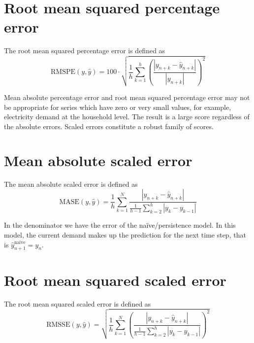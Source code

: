 \section{Root mean squared percentage error}\label{rmspe}
\begin{definition}
    The root mean squared percentage error is defined as
    $$
    \mathrm{RMSPE}(y,\hat{y})=100\cdot\sqrt{\frac{1}{h}\sum\limits_{k=1}^{h} \left(\frac{|y_{n+k}-\hat{y}_{n+k}|}{|y_{n+k}|}\right)^2}
    $$
\end{definition}
Mean absolute percentage error and root mean squared percentage error may not be appropriate for series which have zero or very small values, for example, electricity demand at the household level. The result is a large score regardless of the absolute errors.
Scaled errors constitute a robust family of scores.
\section{Mean absolute scaled error}\label{mase}
\begin{definition}
    The mean absolute scaled error is defined as
    $$
    \mathrm{MASE}(y,\hat{y})=\frac{1}{h}\sum\limits_{k=1}^N\frac{|y_{n+k}-\hat{y}_{n+k}|}{\frac{1}{h-1}\sum\limits_{k=2}^{h}|y_{k}-y_{k-1}|}
    $$
\end{definition}
In the denominator we have the error of the naïve/persistence model. 
In this model, the current demand makes up the prediction for the next time step, that is $\hat{y}^{\mathrm{naive}}_{n+1}=y_{n}$.
\section{Root mean squared scaled error}\label{rmsse}
\begin{definition}
    The root mean squared scaled error is defined as
    $$
    \mathrm{RMSSE}(y,\hat{y})=\sqrt{\frac{1}{h}\sum\limits_{k=1}^N\left(\frac{|y_{n+k}-\hat{y}_{n+k}|}{\frac{1}{h-1}\sum\limits_{k=2}^{h}|y_{k}-y_{k-1}|}\right)^2}
    $$
\end{definition}


